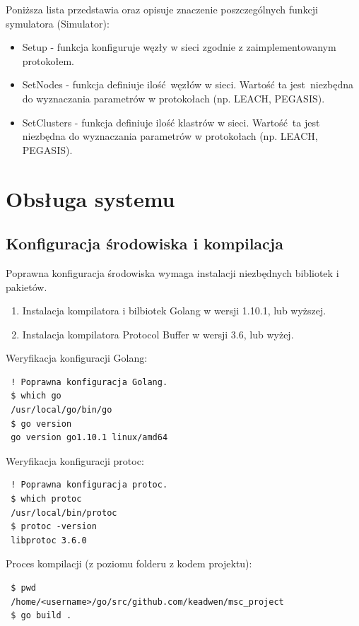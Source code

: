 \documentclass[a4paper,12pt,twoside,openany]{report}
\begin{document}
Poniższa lista przedstawia oraz opisuje znaczenie poszczególnych funkcji symulatora (Simulator):

\begin{itemize}
 \item Setup - funkcja konfiguruje węzły w sieci zgodnie z zaimplementowanym protokołem.
 \item SetNodes - funkcja definiuje ilość węzłów w sieci. Wartość ta jest niezbędna do wyznaczania parametrów w protokołach (np. LEACH, PEGASIS).
 \item SetClusters - funkcja definiuje ilość klastrów w sieci. Wartość ta jest niezbędna do wyznaczania parametrów w protokołach (np. LEACH, PEGASIS).
\end{itemize}

\section{Obsługa systemu}
 
\subsection{Konfiguracja środowiska i kompilacja}

Poprawna konfiguracja środowiska wymaga instalacji niezbędnych bibliotek i pakietów.

\begin{enumerate}
 \item Instalacja kompilatora i bilbiotek Golang w wersji 1.10.1, lub wyższej.
 \item Instalacja kompilatora Protocol Buffer w wersji 3.6, lub wyżej.
\end{enumerate}

Weryfikacja konfiguracji Golang:

\begin{lstlisting}
 ! Poprawna konfiguracja Golang.
 $ which go
 /usr/local/go/bin/go
 $ go version
 go version go1.10.1 linux/amd64
\end{lstlisting}

Weryfikacja konfiguracji protoc:

\begin{lstlisting}
 ! Poprawna konfiguracja protoc.
 $ which protoc
 /usr/local/bin/protoc
 $ protoc -version
 libprotoc 3.6.0
\end{lstlisting}

Proces kompilacji (z poziomu folderu z kodem projektu):

\begin{lstlisting}
 $ pwd
 /home/<username>/go/src/github.com/keadwen/msc_project
 $ go build .
\end{lstlisting}
\end{document}
